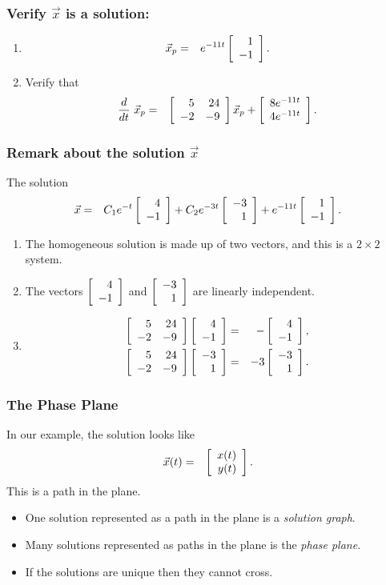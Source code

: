 \begin{frame}
  \frametitle{Verify $\vec{x}$ is a solution:}
  \begin{enumerate}

  \item 
    \begin{eqnarray*}
      \vec{x}_p & = & e^{-11t} \vecTwo{1}{-1}.
    \end{eqnarray*}

  \item  Verify that  
   \begin{eqnarray*}
      \deriv{~}{t} \vec{x}_p & = & \arrayTwo{5}{24}{-2}{-9} \vec{x}_p
        + \vecTwo{8e^{-11t}}{4e^{-11t}}.
    \end{eqnarray*}


  \end{enumerate}

\end{frame}

\begin{frame}
 \frametitle{Remark about the solution $\vec{x}$}
  The solution
   \begin{eqnarray*}
      \vec{x} & = &  
      C_1 e^{-t} \vecTwo{4}{-1} + C_2 e^{-3t} \vecTwo{-3}{1} 
      +  e^{-11t} \vecTwo{1}{-1}.
    \end{eqnarray*}

  \begin{enumerate}

  \item The homogeneous solution is made up of two vectors, and this
    is a $2\times 2$ system.
  \item The vectors $\vecTwo{4}{-1}$ and $\vecTwo{-3}{1}$ are linearly
    independent.
  \item
    \begin{eqnarray*}
      \arrayTwo{5}{24}{-2}{-9} \vecTwo{4}{-1} & = & - \vecTwo{4}{-1}, \\
      \arrayTwo{5}{24}{-2}{-9} \vecTwo{-3}{1} & = & -3 \vecTwo{-3}{1}.
    \end{eqnarray*}
  \end{enumerate}

\end{frame}

\begin{frame}
  \frametitle{The Phase Plane}

  In our example, the solution looks like
  \begin{eqnarray*}
    \vec{x}(t) & = & \vecTwo{x(t)}{y(t)}.
  \end{eqnarray*}
  This is a path in the plane.

  \begin{itemize}
  \item One solution represented as a path in the plane is a \textit{solution graph}.
  \item Many solutions represented as paths in the plane is the \textit{phase plane}.
  \item If the solutions are unique then they cannot cross.
  \end{itemize}

\end{frame}

